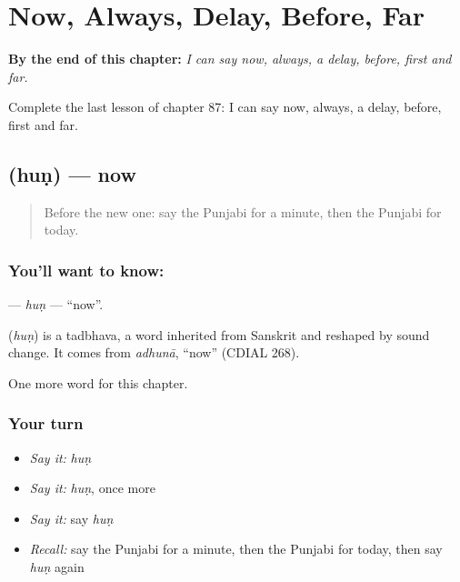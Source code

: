 
\chapter{Now, Always, Delay, Before, Far}
\label{ch:pa-now-always-delay-before-far}

\begin{chapteropening}
\textbf{By the end of this chapter:} \emph{I can say now, always, a delay, before, first and far.}

Complete the last lesson of chapter 87: I can say now, always, a delay, before, first and far.
\end{chapteropening}

\section[\texorpdfstring{\pa{ਹੁਣ} (huṇ)}{ਹੁਣ (huṇ)}]{ (huṇ) — now}

\label{lesson:PA-C87-hun}



\begin{quote}
Before the new one: say the Punjabi for a minute, then the Punjabi for today.
\end{quote}

\subsection*{You'll want to know: }
\textbf{} — \emph{huṇ} — \textquotedblleft{}now\textquotedblright{}.

\begin{cousinweb}
\textbf{} (\emph{huṇ}) is a tadbhava, a word inherited from Sanskrit and reshaped by sound change. It comes from \emph{adhunā}, \textquotedblleft{}now\textquotedblright{} (CDIAL 268).
\end{cousinweb}

\begin{grammarlens}[title={What you've built}]
One more word for this chapter.
\end{grammarlens}

\subsection*{Your turn}
\begin{itemize}
\raggedright
  \item \emph{Say it:} \emph{huṇ}
  \item \emph{Say it:} \emph{huṇ}, once more
  \item \emph{Say it:} say \emph{huṇ}
  \item \emph{Recall:} say the Punjabi for a minute, then the Punjabi for today, then say \emph{huṇ} again
\end{itemize}

